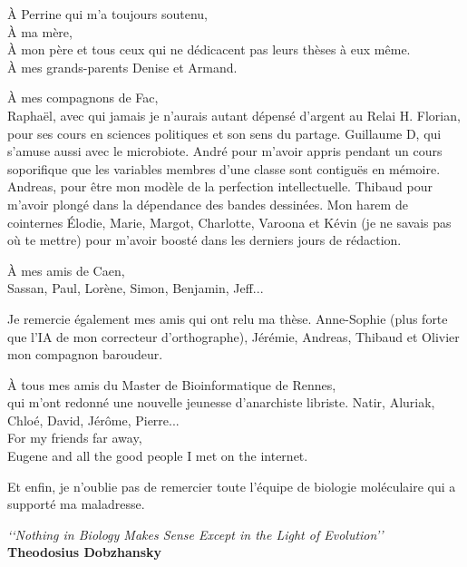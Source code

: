 \documentclass[12pt,a4paper]{article}
\begin{document}
\begin{flushleft}

À Perrine qui m'a toujours soutenu, \\
\vspace{0.5cm}
À ma mère, \\
À mon père et tous ceux qui ne dédicacent pas leurs thèses à eux même. \\
À mes grands-parents Denise et Armand. \\

\vspace{0.5cm}



\vspace{1cm}

À mes compagnons de Fac,\\
Raphaël, avec qui jamais je n'aurais autant dépensé d'argent au Relai H. Florian, pour ses cours en sciences politiques et son sens du partage. Guillaume D,  qui s'amuse aussi avec le microbiote. André pour m'avoir appris pendant un cours soporifique que les variables membres d'une classe sont contiguës en mémoire. Andreas, pour être mon modèle de la perfection intellectuelle. Thibaud pour m'avoir plongé dans la dépendance des bandes dessinées. Mon harem de cointernes Élodie, Marie, Margot, Charlotte, Varoona et Kévin (je ne savais pas où te mettre) pour m'avoir boosté dans les derniers jours de rédaction.

\vspace{0.5cm}
À mes amis de Caen, \\
Sassan, Paul, Lorène, Simon, Benjamin, Jeff...\\
\vspace{0.5cm}

Je remercie également mes amis qui ont relu ma thèse. Anne-Sophie (plus forte que l'IA de mon correcteur d'orthographe), Jérémie, Andreas, Thibaud et Olivier mon compagnon baroudeur. \\

\vspace{0.5cm}

À tous mes amis du Master de Bioinformatique de Rennes, \\
qui m'ont redonné une nouvelle jeunesse d'anarchiste libriste. Natir, Aluriak, Chloé, David, Jérôme, Pierre... \\
\vspace{0.5cm}
For my friends far away, \\
Eugene and all the good people I met on the internet.


\vspace{0.5cm}
Et enfin, je n'oublie pas de remercier toute l'équipe de biologie moléculaire qui a supporté ma maladresse. \\
\vspace{2.0cm}


\centering\textit{‘‘Nothing in Biology Makes Sense Except in the Light of Evolution’’}\\
\centering \textbf{Theodosius Dobzhansky}
\vspace{0.5cm}

\end{flushleft}
\newpage
\tableofcontents
\newpage
\listoffigures
\newpage
\listoftables
\newpage
\end{document}
